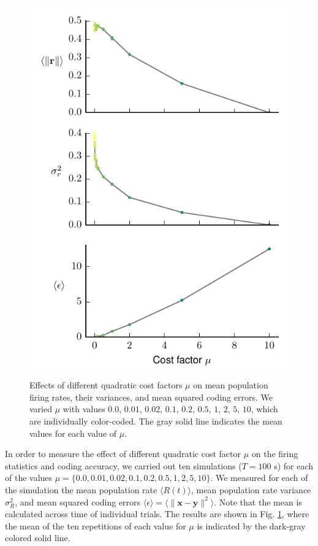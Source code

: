 \documentclass[twoside,twocolumn]{article}
\renewcommand{\b}[1]{\textbf{#1}}
\begin{document}
\begin{figure}[!ht]
  \includegraphics[width=\columnwidth]{../plots/Fig3.pdf}
  \caption{Effects of different quadratic cost factors $\mu$ on mean population firing rates, their variances, and mean squared coding errors. We varied $\mu$ with values $0.0$, $0.01$, $0.02$, $0.1$, $0.2$, $0.5$, $1$, $2$, $5$, $10$, which are individually color-coded. The gray solid line indicates the mean values for each value of $\mu$.}
  \label{fig:mu}
\end{figure}

In order to measure the effect of different quadratic cost factor $\mu$ on the firing statistics and coding accuracy, we carried out ten simulations ($T=100$ s) for each of the values $\mu = \{ 0.0, 0.01, 0.02, 0.1, 0.2, 0.5, 1, 2, 5, 10 \}$. We measured for each of the simulation the mean population rate $\langle R(t)\rangle$, mean population rate variance $\sigma^2_R$, and mean squared coding errors $\langle \epsilon \rangle = \langle \| \b{x}-\b{y} \|^2 \rangle$. Note that the mean is calculated across time of individual trials. The results are shown in Fig. \ref{fig:mu}, where the mean of the ten repetitions of each value for $\mu$ is indicated by the dark-gray colored solid line.
\end{document}

